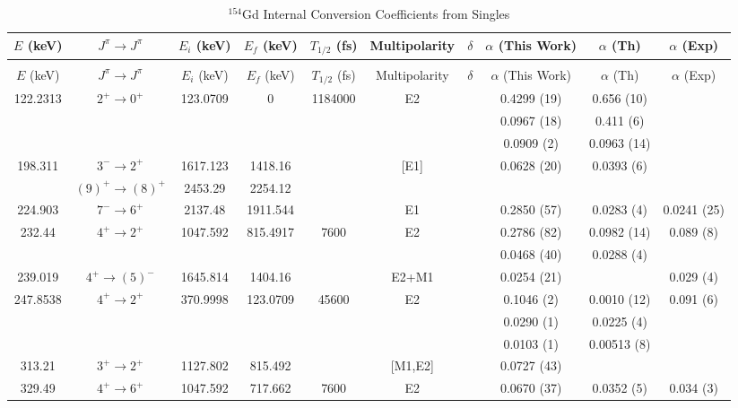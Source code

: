 \begin{landscape}
    \begin{longtable}{c|c|c|c|c|c|c|c|c|c}
    \caption{$^{154}$Gd Internal Conversion Coefficients from Singles}
        \label{tab:154Gd_Single_ICC}\\
        $E$ (keV)	&	$J^{\pi}	\rightarrow	J^{\pi}$	&	$E_i$ (keV)	&	$E_f$ (keV)	&	$T_{1/2}$ (fs)	&	Multipolarity	&	$\delta$	&	$\alpha$ (This Work)				&	$\alpha$  (Th)	&	$\alpha$ (Exp)	\\
\hline
        \endfirsthead
    \caption[]{$^{154}$Gd Internal Conversion Coefficients from Singles}\\
$E$ (keV)	&	$J^{\pi}	\rightarrow	J^{\pi}$	&	$E_i$ (keV)	&	$E_f$ (keV)	&	$T_{1/2}$ (fs)	&	Multipolarity	&	$\delta$	&	$\alpha$ (This Work)				&	$\alpha$  (Th)	&	$\alpha$ (Exp)	\\
\hline
	\endhead
	\hline
122.2313	&	$2^+	\rightarrow	0^+$	&	123.0709	&	0	&	1184000	&	E2	&		&	0.4299	(19)	&	0.656 (10)	&		\\
	&				&		&		&		&		&		&	0.0967	(18)	&	0.411 (6)	&		\\
	&				&		&		&		&		&		&	0.0909	(2)	&	0.0963 (14)	&		\\
198.311	&	$3^-	\rightarrow	2^+$	&	1617.123	&	1418.16	&		&	[E1]	&		&	0.0628	(20)	&	0.0393 (6)	&		\\
	&	$(9)^+	\rightarrow	(8)^+$	&	2453.29	&	2254.12	&		&		&		&					&		&		\\
224.903	&	$7^-	\rightarrow	6^+$	&	2137.48	&	1911.544	&		&	E1	&		&	0.2850	(57)	&	0.0283 (4)	&	0.0241 (25)	\\
232.44	&	$4^+	\rightarrow	2^+$	&	1047.592	&	815.4917	&	7600	&	E2	&		&	0.2786	(82)	&	0.0982 (14)	&	0.089 (8)	\\
	&				&		&		&		&		&		&	0.0468	(40)	&	0.0288 (4)	&		\\
239.019	&	$4^+	\rightarrow	(5)^-$	&	1645.814	&	1404.16	&		&	E2+M1	&		&	0.0254	(21)	&		&	0.029 (4)	\\
247.8538	&	$4^+	\rightarrow	2^+$	&	370.9998	&	123.0709	&	45600	&	E2	&		&	0.1046	(2)	&	0.0010 (12)	&	0.091 (6)	\\
	&				&		&		&		&		&		&	0.0290	(1)	&	0.0225 (4)	&		\\
	&				&		&		&		&		&		&	0.0103	(1)	&	0.00513 (8)	&		\\
313.21	&	$3^+	\rightarrow	2^+$	&	1127.802	&	815.492	&		&	[M1,E2]	&		&	0.0727	(43)	&		&		\\
329.49	&	$4^+	\rightarrow	6^+$	&	1047.592	&	717.662	&	7600	&	E2	&		&	0.0670	(37)	&	0.0352 (5)	&	0.034 (3)	\\

\end{longtable}
\end{landscape}
